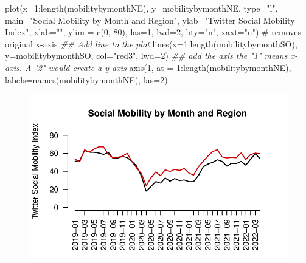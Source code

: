\documentclass[
  letterpaper,
  DIV=11,
  numbers=noendperiod]{scrreprt}
\newenvironment{Shaded}{\begin{snugshade}}{\end{snugshade}}
\newcommand{\AttributeTok}[1]{\textcolor[rgb]{0.40,0.45,0.13}{#1}}
\newcommand{\CommentTok}[1]{\textcolor[rgb]{0.37,0.37,0.37}{#1}}
\newcommand{\DecValTok}[1]{\textcolor[rgb]{0.68,0.00,0.00}{#1}}
\newcommand{\DocumentationTok}[1]{\textcolor[rgb]{0.37,0.37,0.37}{\textit{#1}}}
\newcommand{\FunctionTok}[1]{\textcolor[rgb]{0.28,0.35,0.67}{#1}}
\newcommand{\NormalTok}[1]{\textcolor[rgb]{0.00,0.23,0.31}{#1}}
\newcommand{\SpecialCharTok}[1]{\textcolor[rgb]{0.37,0.37,0.37}{#1}}
\newcommand{\StringTok}[1]{\textcolor[rgb]{0.13,0.47,0.30}{#1}}
\begin{document}
\begin{Shaded}
\begin{Highlighting}[]
\FunctionTok{plot}\NormalTok{(}\AttributeTok{x=}\DecValTok{1}\SpecialCharTok{:}\FunctionTok{length}\NormalTok{(mobilitybymonthNE),}
     \AttributeTok{y=}\NormalTok{mobilitybymonthNE,}
     \AttributeTok{type=}\StringTok{"l"}\NormalTok{, }
     \AttributeTok{main=}\StringTok{"Social Mobility by Month and Region"}\NormalTok{,}
     \AttributeTok{ylab=}\StringTok{"Twitter Social Mobility Index"}\NormalTok{,}
     \AttributeTok{xlab=}\StringTok{""}\NormalTok{,}
     \AttributeTok{ylim =} \FunctionTok{c}\NormalTok{(}\DecValTok{0}\NormalTok{, }\DecValTok{80}\NormalTok{),}
     \AttributeTok{las=}\DecValTok{1}\NormalTok{, }
     \AttributeTok{lwd=}\DecValTok{2}\NormalTok{, }
     \AttributeTok{bty=}\StringTok{"n"}\NormalTok{,}
     \AttributeTok{xaxt=}\StringTok{"n"}\NormalTok{) }\CommentTok{\# removes original x{-}axis}
\DocumentationTok{\#\# Add line to the plot }
\FunctionTok{lines}\NormalTok{(}\AttributeTok{x=}\DecValTok{1}\SpecialCharTok{:}\FunctionTok{length}\NormalTok{(mobilitybymonthSO),}
     \AttributeTok{y=}\NormalTok{mobilitybymonthSO, }\AttributeTok{col=}\StringTok{"red3"}\NormalTok{, }\AttributeTok{lwd=}\DecValTok{2}\NormalTok{)}
\DocumentationTok{\#\# add the axis the "1" means x{-}axis. A "2" would create a y{-}axis}
\FunctionTok{axis}\NormalTok{(}\DecValTok{1}\NormalTok{, }\AttributeTok{at =} \DecValTok{1}\SpecialCharTok{:}\FunctionTok{length}\NormalTok{(mobilitybymonthNE), }
     \AttributeTok{labels=}\FunctionTok{names}\NormalTok{(mobilitybymonthNE), }\AttributeTok{las=}\DecValTok{2}\NormalTok{)}
\end{Highlighting}
\end{Shaded}

\begin{figure}[H]

{\centering \includegraphics{04-Visualization_files/figure-pdf/unnamed-chunk-42-1.pdf}

}

\end{figure}
\end{document}
